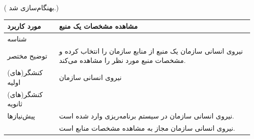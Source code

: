 \newpage
\begin{table}[H]
	({\color{red} بهنگام‌سازی شد.})\\
	\centering
	\begin{tabular}{|p{3cm}|p{10cm}|}
		\hline
		
		مورد کاربرد	& مشاهده مشخصات یک منبع  \\
		\hline
		
		شناسه & 
		\stepcounter{usecase_ID}
		
		\arabic{usecase_ID} \\
		
		\hline
		
		توضیح مختصر & نیروی انسانی سازمان یک منبع از منابع سازمان را انتخاب کرده و مشخصات منبع مورد نظر را مشاهده می‌کند. \\
		\hline
		
		کنشگر(های) اولیه& نیروی انسانی سازمان  \\
		\hline
		
		کنشگر(های) ثانویه&  \\
		\hline
		
		پیش‌نیازها &
		نیروی انسانی سازمان در سیستم برنامه‌ریزی وارد شده است.\\
		& نیروی انسانی سازمان مجاز به مشاهده مشخصات منابع است. \\
		\hline
		

\end{tabular}
\end{table}
